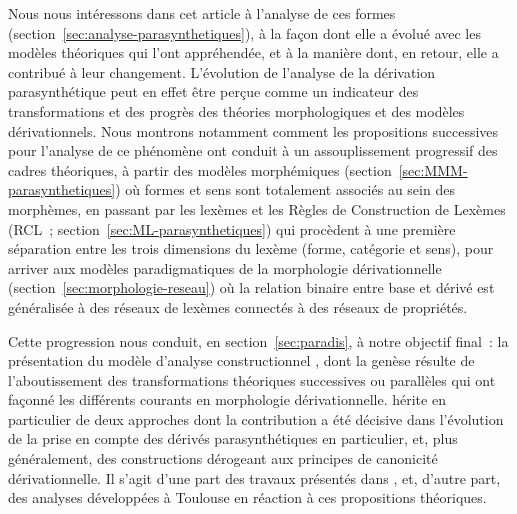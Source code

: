 \documentclass[output=paper]{langsci/langscibook}
\begin{document}
Nous nous intéressons dans cet article à l'analyse de ces formes (section~\ref{sec:analyse-parasynthetiques}),  à la façon dont elle a évolué avec les modèles théoriques qui l'ont appréhendée, et à la manière dont, en retour, elle a contribué à leur changement.
L'évolution de l'analyse de la dérivation parasynthétique peut en effet être perçue comme un indicateur des transformations et des progrès des théories morphologiques et des modèles dérivationnels.  Nous  montrons notamment comment les propositions successives pour l'analyse de ce phénomène  ont conduit à un assouplissement progressif des cadres théoriques,  à partir des modèles morphémiques (section~\ref{sec:MMM-parasynthetiques}) où formes et sens sont totalement associés au sein des morphèmes, en passant par les lexèmes et les Règles de Construction de Lexèmes (RCL~; section~\ref{sec:ML-parasynthetiques}) qui procèdent à une première séparation entre les trois dimensions  du lexème  (forme, catégorie et sens), pour arriver aux modèles paradigmatiques de la morphologie dérivationnelle (section~\ref{sec:morphologie-reseau}) où la relation binaire entre base et dérivé est généralisée à des réseaux de lexèmes  connectés à des réseaux de propriétés.

Cette progression nous conduit, en section~\ref{sec:paradis}, à notre objectif final~: la présentation du modèle d'analyse constructionnel \paradis{}, dont la genèse résulte de l'aboutissement des transformations théoriques successives ou parallèles qui ont façonné les différents courants en morphologie dérivationnelle. \paradis{} hérite en particulier de deux approches dont la contribution a été décisive dans l'évolution de la prise en compte des dérivés parasynthétiques en particulier, et, plus généralement, des constructions dérogeant aux principes de canonicité dérivationnelle. Il s'agit d'une part des travaux présentés dans \cite{Fradin03}, et, d'autre part, des analyses développées à Toulouse en réaction à ces propositions théoriques.
\end{document}
